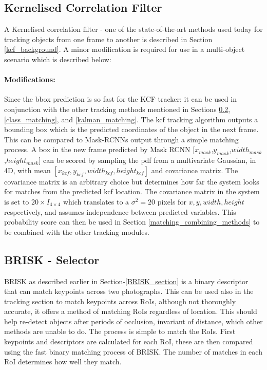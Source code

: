 \documentclass[11pt,twoside]{report}
\begin{document}
\subsection{Kernelised Correlation Filter}
A Kernelised correlation filter - one of the state-of-the-art methods used today for tracking objects from one frame to another is described in Section \ref{kcf_background}. A minor modification is required for use in a multi-object scenario which is described below:

\paragraph{Modifications:}
Since the bbox prediction is so fast for the KCF tracker; it can be used in conjunction with the other tracking methods mentioned in Sections \ref{BRISK_matching}, \ref{class_matching}, and \ref{kalman_matching}. The kcf tracking algorithm outputs a bounding box which is the predicted coordinates of the object in the next frame. This can be compared to Mask-RCNNs output through a simple matching process. A box in the new frame predicted by Mask RCNN $[x_{mask}$,$y_{mask}$,$width_{mask}$,$height_{mask}]$ can be scored by sampling the pdf from a multivariate Gaussian, in 4D, with mean $[x_{kcf},y_{kcf},width_{kcf},height_{kcf}]$ and covariance matrix. The covariance matrix is an arbitrary choice but determines how far the system looks for matches from the predicted kcf location. The covariance matrix in the system is set to $20 \times I_{4 \times 4}$ which translates to a $\sigma^{2} = 20$ pixels for $x,y,width,height$ respectively, and assumes independence between predicted variables. This probability score can then be used in Section \ref{matching_combining_methods} to be combined with the other tracking modules.


\subsection{BRISK - Selector} \label{BRISK_matching}
BRISK as described earlier in Section-\ref{BRISK_section} is a binary descriptor that can match keypoints across two photographs. This can be used also in the tracking section to match keypoints across RoIs, although not thoroughly accurate, it offers a method of matching RoIs regardless of location. This should help re-detect objects after periods of occlusion, invariant of distance, which other methods are unable to do. The process is simple to match the RoIs. First keypoints and descriptors are calculated for each RoI, these are then compared using the fast binary matching process of BRISK. The number of matches in each RoI determines how well they match.
\end{document}
